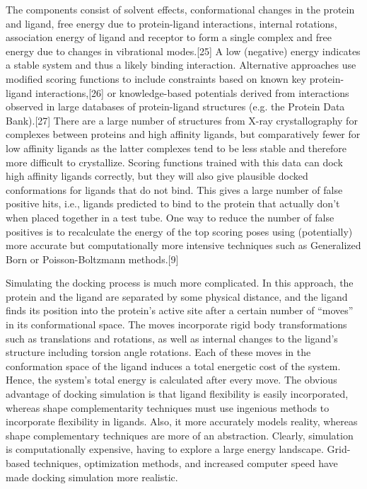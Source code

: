 The components consist of solvent effects, conformational changes in the protein and ligand, free energy due to protein-ligand interactions, internal rotations, association energy of ligand and receptor to form a single complex and free energy due to changes in vibrational modes.[25] A low (negative) energy indicates a stable system and thus a likely binding interaction.
Alternative approaches use modified scoring functions to include constraints based on known key protein-ligand interactions,[26] or knowledge-based potentials derived from interactions observed in large databases of protein-ligand structures (e.g. the Protein Data Bank).[27]
There are a large number of structures from X-ray crystallography for complexes between proteins and high affinity ligands, but comparatively fewer for low affinity ligands as the latter complexes tend to be less stable and therefore more difficult to crystallize. Scoring functions trained with this data can dock high affinity ligands correctly, but they will also give plausible docked conformations for ligands that do not bind. This gives a large number of false positive hits, i.e., ligands predicted to bind to the protein that actually don't when placed together in a test tube.
One way to reduce the number of false positives is to recalculate the energy of the top scoring poses using (potentially) more accurate but computationally more intensive techniques such as Generalized Born or Poisson-Boltzmann methods.[9]

Simulating the docking process is much more complicated. In this approach, the protein and the ligand are separated by some physical distance, and the ligand finds its position into the protein's active site after a certain number of “moves” in its conformational space. The moves incorporate rigid body transformations such as translations and rotations, as well as internal changes to the ligand's structure including torsion angle rotations. Each of these moves in the conformation space of the ligand induces a total energetic cost of the system. Hence, the system's total energy is calculated after every move.
The obvious advantage of docking simulation is that ligand flexibility is easily incorporated, whereas shape complementarity techniques must use ingenious methods to incorporate flexibility in ligands. Also, it more accurately models reality, whereas shape complementary techniques are more of an abstraction.
Clearly, simulation is computationally expensive, having to explore a large energy landscape. Grid-based techniques, optimization methods, and increased computer speed have made docking simulation more realistic.

